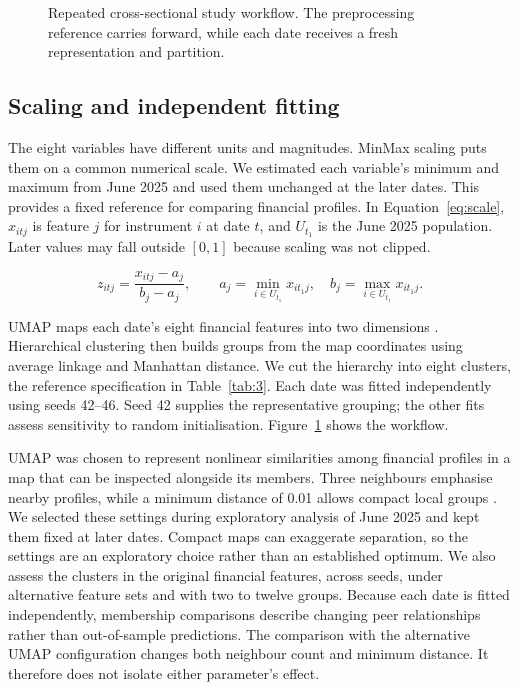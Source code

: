 

\begin{figure}[htbp]
\centering
{}
\caption{Repeated cross-sectional study workflow. The preprocessing reference carries forward, while each date receives a fresh representation and partition.}\label{fig:pipeline}
\end{figure}


\subsection{Scaling and independent fitting}

The eight variables have different units and magnitudes. MinMax scaling puts them on a common numerical scale. We estimated each variable's minimum and maximum from June 2025 and used them unchanged at the later dates. This provides a fixed reference for comparing financial profiles. In Equation~\ref{eq:scale}, $x_{itj}$ is feature $j$ for instrument $i$ at date $t$, and $U_{t_1}$ is the June 2025 population. Later values may fall outside $[0,1]$ because scaling was not clipped.


\begin{equation}
z_{itj}=\frac{x_{itj}-a_j}{b_j-a_j},\qquad
a_j=\min_{i\in U_{t_1}}x_{it_1j},\quad b_j=\max_{i\in U_{t_1}}x_{it_1j}.
\label{eq:scale}\end{equation}

UMAP maps each date's eight financial features into two dimensions \citep{mcinnes2018}. Hierarchical clustering then builds groups from the map coordinates using average linkage and Manhattan distance. We cut the hierarchy into eight clusters, the reference specification in Table~\ref{tab:3}. Each date was fitted independently using seeds 42--46. Seed 42 supplies the representative grouping; the other fits assess sensitivity to random initialisation. Figure~\ref{fig:pipeline} shows the workflow.

UMAP was chosen to represent nonlinear similarities among financial profiles in a map that can be inspected alongside its members. Three neighbours emphasise nearby profiles, while a minimum distance of 0.01 allows compact local groups \citep{umapdocs}. We selected these settings during exploratory analysis of June 2025 and kept them fixed at later dates. Compact maps can exaggerate separation, so the settings are an exploratory choice rather than an established optimum. We also assess the clusters in the original financial features, across seeds, under alternative feature sets and with two to twelve groups. Because each date is fitted independently, membership comparisons describe changing peer relationships rather than out-of-sample predictions. The comparison with the alternative UMAP configuration changes both neighbour count and minimum distance. It therefore does not isolate either parameter's effect.

